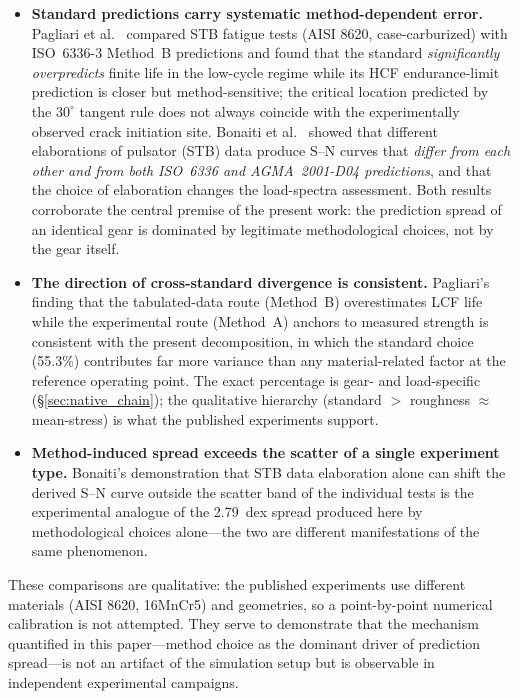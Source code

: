 \documentclass[twocolumn,12pt,a4paper]{article}
\begin{document}
\begin{itemize}
  \item \textbf{Standard predictions carry systematic method-dependent
        error.} Pagliari et al.~\cite{pagliari2025} compared STB fatigue
        tests (AISI 8620, case-carburized) with ISO~6336-3 Method~B
        predictions and found that the standard \emph{significantly
        overpredicts} finite life in the low-cycle regime while its
        HCF endurance-limit prediction is closer but method-sensitive;
        the critical location predicted by the $30^\circ$ tangent rule
        does not always coincide with the experimentally observed crack
        initiation site. Bonaiti et al.~\cite{bonaiti2024} showed that
        different elaborations of pulsator (STB) data produce S--N
        curves that \emph{differ from each other and from both
        ISO~6336 and AGMA~2001-D04 predictions}, and that the choice of
        elaboration changes the load-spectra assessment. Both results
        corroborate the central premise of the present work: the
        prediction spread of an identical gear is dominated by
        legitimate methodological choices, not by the gear itself.
  \item \textbf{The direction of cross-standard divergence is
        consistent.} Pagliari's finding that the tabulated-data route
        (Method~B) overestimates LCF life while the experimental route
        (Method~A) anchors to measured strength is consistent with the
        present decomposition, in which the standard choice (55.3\%)
        contributes far more variance than any material-related factor
        at the reference operating point. The exact percentage is
        gear- and load-specific (\S\ref{sec:native_chain}); the
        qualitative hierarchy (standard $>$ roughness $\approx$
        mean-stress) is what the published experiments support.
  \item \textbf{Method-induced spread exceeds the scatter of a single
        experiment type.} Bonaiti's demonstration that STB data
        elaboration alone can shift the derived S--N curve outside the
        scatter band of the individual tests is the experimental
        analogue of the 2.79~dex spread produced here by
        methodological choices alone---the two are different
        manifestations of the same phenomenon.
\end{itemize}

These comparisons are qualitative: the published experiments use
different materials (AISI 8620, 16MnCr5) and geometries, so a
point-by-point numerical calibration is not attempted. They serve to
demonstrate that the mechanism quantified in this paper---method
choice as the dominant driver of prediction spread---is not an
artifact of the simulation setup but is observable in independent
experimental campaigns.
\end{document}

